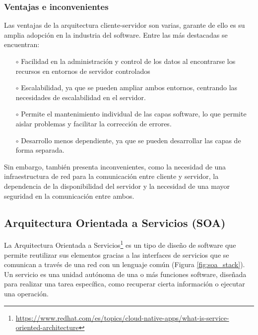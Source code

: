 \subsubsection*{Ventajas e inconvenientes}

Las ventajas de la arquitectura cliente-servidor son varias, garante de ello es su amplia adopción en la industria del software. Entre las más destacadas se encuentran:

\begin{itemize}
    \item [$\circ$] Facilidad en la administración y control de los datos al encontrarse los recursos en entornos de servidor controlados
    \item [$\circ$] Escalabilidad, ya que se pueden ampliar ambos entornos, centrando las necesidades de escalabilidad en el servidor.
    \item [$\circ$] Permite el mantenimiento individual de las capas software, lo que permite aislar problemas y facilitar la corrección de errores.
    \item [$\circ$] Desarrollo menos dependiente, ya que se pueden desarrollar las capas de forma separada.
\end{itemize}

Sin embargo, también presenta inconvenientes, como la necesidad de una infraestructura de red para la comunicación entre cliente y servidor, la dependencia de la disponibilidad del servidor y la necesidad de una mayor seguridad en la comunicación entre ambos.\newline


\subsection{Arquitectura Orientada a Servicios (SOA)}

La Arquitectura Orientada a Servicios\footnote{\url{https://www.redhat.com/es/topics/cloud-native-apps/what-is-service-oriented-architecture}} es un tipo de diseño de software que permite reutilizar sus elementos gracias a las interfaces de servicios que se comunican a través de una red con un lenguaje común (Figura \ref{fig:soa_stack}). Un servicio es una unidad autónoma de una o más funciones software, diseñada para realizar una tarea específica, como recuperar cierta información o ejecutar una operación.\newline


